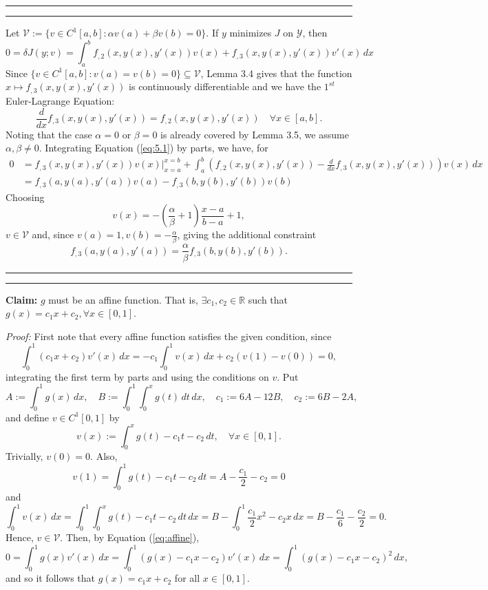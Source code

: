 \documentclass[11pt]{article}
\newcounter{questionCounter}
\newcounter{partCounter}[questionCounter]
\newenvironment{question}[2][\arabic{questionCounter}]{%
    \setcounter{partCounter}{0}%
    \vspace{.25in} \hrule \vspace{0.5em}%
        \noindent{\bf #2}%
    \vspace{0.8em} \hrule \vspace{.10in}%
    \addtocounter{questionCounter}{1}%
}{}
\newcommand{\R}{\mathbb{R}}             %
\newcommand{\Y}{\mathscr{Y}}            %
\newcommand{\V}{\mathscr{V}}            %
\begin{document}
\begin{question}{Problem 5}
Let $\V := \{v \in C^1[a,b] : \alpha v(a) + \beta v(b) = 0\}$. If $y$ minimizes
$J$ on $\Y$, then
\begin{equation}
0
    = \delta J(y;v)
    = \int_a^b f_{,2}(x,y(x),y'(x))v(x) + f_{,3}(x,y(x),y'(x))v'(x) \, dx
\label{eq:5.1}
\end{equation}
Since $\{v \in C^1[a,b] : v(a) = v(b) = 0\} \subseteq \V$, Lemma 3.4 gives that
the function $x \mapsto f_{,3}(x,y(x),y'(x))$ is continuously differentiable
and we have the $1^{st}$ Euler-Lagrange Equation:
\[\frac{d}{dx} f_{,3}(x,y(x),y'(x)) = f_{,2}(x,y(x),y'(x))
    \quad \forall x \in [a,b].\]
Noting that the case $\alpha = 0$ or $\beta = 0$ is already covered by Lemma
3.5, we assume $\alpha, \beta \neq 0$. Integrating Equation (\ref{eq:5.1}) by
parts, we have, for
\begin{align*}
0
 &  = f_{,3}(x,y(x),y'(x))v(x)\bigg|_{x = a}^{x = b}
    + \int_a^b \left( f_{,2}(x,y(x),y'(x))
    - \frac{d}{dx} f_{,3}(x,y(x),y'(x)) \right) v(x) \, dx  \\
 &  = f_{,3}(a,y(a),y'(a))v(a) - f_{,3}(b,y(b),y'(b))v(b)
\end{align*}
Choosing
\[v(x) = -\left( \frac{\alpha}{\beta} + 1 \right) \frac{x - a}{b - a} + 1,\]
$v \in \V$ and, since $v(a) = 1, v(b) = -\frac{\alpha}{\beta}$, giving the
additional constraint
\[f_{,3}(a,y(a),y'(a)) = \frac{\alpha}{\beta}f_{,3}(b,y(b),y'(b)).\]
\end{question}

\begin{question}{Problem 6}
{\bf Claim:} $g$ must be an affine function. That is, $\exists c_1,c_2 \in \R$
such that $g(x) = c_1x + c_2, \forall x \in [0,1]$.

\emph{Proof:}
First note that every affine function satisfies the given condition, since
\begin{equation}
\int_0^1(c_1x + c_2)v'(x) \, dx
    = -c_1\int_0^1 v(x) \, dx + c_2(v(1) - v(0))
    = 0,
\label{eq:affine}
\end{equation}
integrating the first term by parts and using the conditions on $v$. Put
\[
A   := \int_0^1 g(x) \, dx, \quad
B   := \int_0^1 \int_0^x g(t) \, dt \, dx, \quad
c_1 := 6A - 12B, \quad
c_2 := 6B - 2A,
\]
and define $v \in C^1[0,1]$ by
\[v(x) := \int_0^x g(t) - c_1t - c_2 \, dt, \quad \forall x \in [0,1].\]
Trivially, $v(0) = 0$. Also,
\[
v(1)
    = \int_0^1 g(t) - c_1t - c_2 \, dt
    = A - \frac{c_1}{2} - c_2
    = 0
\]
and
\[
\int_0^1 v(x) \, dx
    = \int_0^1 \int_0^x g(t) - c_1t - c_2 \, dt \, dx
    = B - \int_0^1 \frac{c_1}{2}x^2 - c_2x \, dx
    = B - \frac{c_1}{6} - \frac{c_2}{2}
    = 0.
\]
Hence, $v \in \V$. Then, by Equation (\ref{eq:affine}),
\[0
    = \int_0^1 g(x)v'(x) \, dx
    = \int_0^1 (g(x) - c_1x - c_2)v'(x) \, dx
    = \int_0^1 (g(x) - c_1x - c_2)^2 \, dx,
\]
and so it follows that $g(x) = c_1x + c_2$ for all $x \in [0,1]$.
\end{question}
\end{document}
